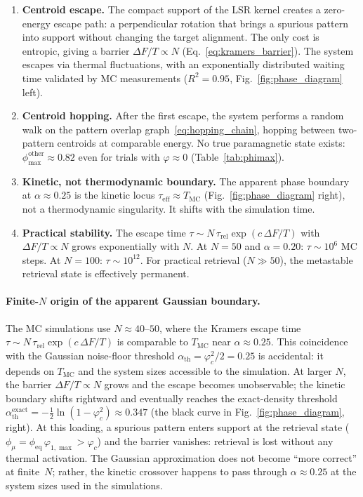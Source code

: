 \documentclass[11pt]{article}
\begin{document}
\begin{enumerate}
\item \textbf{Centroid escape.}  The compact support of the LSR kernel creates a zero-energy escape path: a perpendicular rotation that brings a spurious pattern into support without changing the target alignment.  The only cost is entropic, giving a barrier $\Delta F/T \propto N$ (Eq.~\eqref{eq:kramers_barrier}).  The system escapes via thermal fluctuations, with an exponentially distributed waiting time validated by MC measurements ($R^2 = 0.95$, Fig.~\ref{fig:phase_diagram} left).

\item \textbf{Centroid hopping.}  After the first escape, the system performs a random walk on the pattern overlap graph~\eqref{eq:hopping_chain}, hopping between two-pattern centroids at comparable energy.  No true paramagnetic state exists: $\phi_{\max}^{\mathrm{other}} \approx 0.82$ even for trials with $\varphi \approx 0$ (Table~\ref{tab:phimax}).

\item \textbf{Kinetic, not thermodynamic boundary.}  The apparent phase boundary at $\alpha \approx 0.25$ is the kinetic locus $\tau_{\mathrm{eff}} \approx T_{\mathrm{MC}}$ (Fig.~\ref{fig:phase_diagram} right), not a thermodynamic singularity.  It shifts with the simulation time.

\item \textbf{Practical stability.}  The escape time $\tau \sim N\,\tau_{\mathrm{rel}}\exp(c\,\Delta F/T)$ with $\Delta F/T \propto N$ grows exponentially with $N$.  At $N = 50$ and $\alpha = 0.20$: $\tau \sim 10^6$ MC steps.  At $N = 100$: $\tau \sim 10^{12}$.  For practical retrieval ($N \gg 50$), the metastable retrieval state is effectively permanent.
\end{enumerate}

\paragraph{Finite-$N$ origin of the apparent Gaussian boundary.}
The MC simulations use $N \approx 40$--$50$, where the Kramers escape time $\tau \sim N\,\tau_{\mathrm{rel}}\exp(c\,\Delta F/T)$ is comparable to $T_{\mathrm{MC}}$ near $\alpha \approx 0.25$.  This coincidence with the Gaussian noise-floor threshold $\alpha_{\mathrm{th}} = \varphi_c^2/2 = 0.25$ is accidental: it depends on $T_{\mathrm{MC}}$ and the system sizes accessible to the simulation.  At larger $N$, the barrier $\Delta F/T \propto N$ grows and the escape becomes unobservable; the kinetic boundary shifts rightward and eventually reaches the exact-density threshold $\alpha_{\mathrm{th}}^{\mathrm{exact}} = -\tfrac{1}{2}\ln(1-\varphi_c^2) \approx 0.347$ (the black curve in Fig.~\ref{fig:phase_diagram}, right).  At this loading, a spurious pattern enters support at the retrieval state ($\phi_\mu = \phi_{\mathrm{eq}}\,\varphi_{1,\max} > \varphi_c$) and the barrier vanishes: retrieval is lost without any thermal activation.  The Gaussian approximation does not become ``more correct'' at finite~$N$; rather, the kinetic crossover happens to pass through $\alpha \approx 0.25$ at the system sizes used in the simulations.
\end{document}
